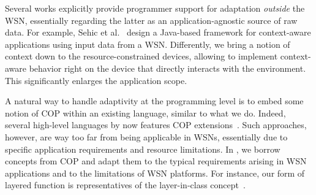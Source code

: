 
 Several works explicitly
provide programmer support for adaptation \emph{outside} the WSN,
essentially regarding the latter as an application-agnostic source of
raw data. For example, Sehic et al.~\cite{Sehic11} design a Java-based
framework for context-aware applications using input data from a
WSN. Differently, we bring a notion of context down to the
resource-constrained devices, allowing to implement context-aware
behavior right on the device that directly interacts with the
environment. This significantly enlarges the application scope.

A natural way to handle adaptivity at the programming level is to
embed some notion of COP within an existing language, similar to what
we do. Indeed, several high-level languages by now features COP
extensions~\cite{Bardram05,Ghezzi10,Kamina11,Salvaneschi12,Sehic11}.
Such approaches, however, are way too far from being applicable in
WSNs, essentially due to specific application requirements and
resource limitations. In \conesc, we borrow concepts from COP and
adapt them to the typical requirements arising in WSN applications and
to the limitations of WSN platforms. For instance, our form of layered
function is representatives of the layer-in-class
concept~\cite{Salvaneschi12}.



